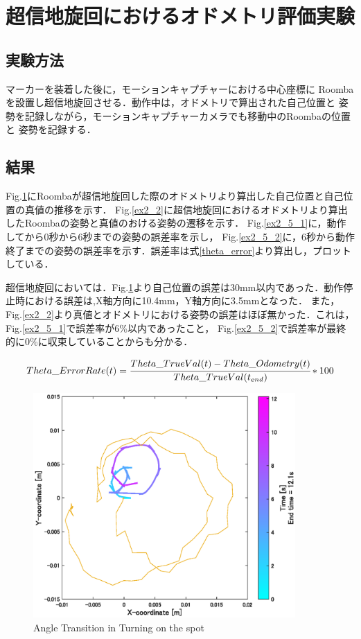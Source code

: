 \documentclass[a4paper,11pt]{jsarticle}
\begin{document}
\newpage

\section{超信地旋回におけるオドメトリ評価実験}\label{ex2}
\subsection{実験方法}
マーカーを装着した後に，モーションキャプチャーにおける中心座標に
Roombaを設置し超信地旋回させる．動作中は，オドメトリで算出された自己位置と
姿勢を記録しながら，モーションキャプチャーカメラでも移動中のRoombaの位置と
姿勢を記録する．

\subsection{結果}
Fig.\ref{ex2_1}にRoombaが超信地旋回した際のオドメトリより算出した自己位置と自己位置の真値の推移を示す．
Fig.\ref{ex2_2}に超信地旋回におけるオドメトリより算出したRoombaの姿勢と真値のおける姿勢の遷移を示す．
Fig.\ref{ex2_5_1}に，動作してから0秒から6秒までの姿勢の誤差率を示し，
Fig.\ref{ex2_5_2}に，6秒から動作終了までの姿勢の誤差率を示す．誤差率は式\ref{theta_error}より算出し，プロットしている．

超信地旋回においては．Fig.\ref{ex2_1}より自己位置の誤差は30mm以内であった．動作停止時における誤差は,X軸方向に10.4mm，Y軸方向に3.5mmとなった．
また，Fig.\ref{ex2_2}より真値とオドメトリにおける姿勢の誤差はほぼ無かった．これは，Fig.\ref{ex2_5_1}で誤差率が6\%以内であったこと，
Fig.\ref{ex2_5_2}で誤差率が最終的に0\%に収束していることからも分かる．

\begin{align}\label{theta_error}
  Theta\_Error Rate(t) = \cfrac{Theta\_True Val(t) - Theta\_Odometry(t)}{Theta\_True Val(t_{end})}* 100
\end{align}

\begin{figure}[H]\centering
\includegraphics[width=100mm]{figure/2_1.eps}
\caption{Angle Transition in Turning on the spot}
\label{ex2_1}\vspace{0zh}\end{figure}
\end{document}
